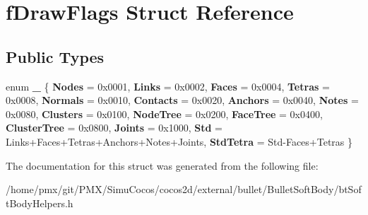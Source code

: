 \hypertarget{structfDrawFlags}{}\section{f\+Draw\+Flags Struct Reference}
\label{structfDrawFlags}
\subsection*{Public Types}
\begin{DoxyCompactItemize}
\item 
\mbox{\label{structfDrawFlags_adf4a6d2e254e39d6a24fa924cfb82ecc}} 
enum {\bfseries \+\_\+} \{ \newline
{\bfseries Nodes} = 0x0001, 
{\bfseries Links} = 0x0002, 
{\bfseries Faces} = 0x0004, 
{\bfseries Tetras} = 0x0008, 
\newline
{\bfseries Normals} = 0x0010, 
{\bfseries Contacts} = 0x0020, 
{\bfseries Anchors} = 0x0040, 
{\bfseries Notes} = 0x0080, 
\newline
{\bfseries Clusters} = 0x0100, 
{\bfseries Node\+Tree} = 0x0200, 
{\bfseries Face\+Tree} = 0x0400, 
{\bfseries Cluster\+Tree} = 0x0800, 
\newline
{\bfseries Joints} = 0x1000, 
{\bfseries Std} = Links+\+Faces+\+Tetras+\+Anchors+\+Notes+\+Joints, 
{\bfseries Std\+Tetra} = Std-\/\+Faces+\+Tetras
 \}
\end{DoxyCompactItemize}


The documentation for this struct was generated from the following file\+:\begin{DoxyCompactItemize}
\item 
/home/pmx/git/\+P\+M\+X/\+Simu\+Cocos/cocos2d/external/bullet/\+Bullet\+Soft\+Body/bt\+Soft\+Body\+Helpers.\+h\end{DoxyCompactItemize}
